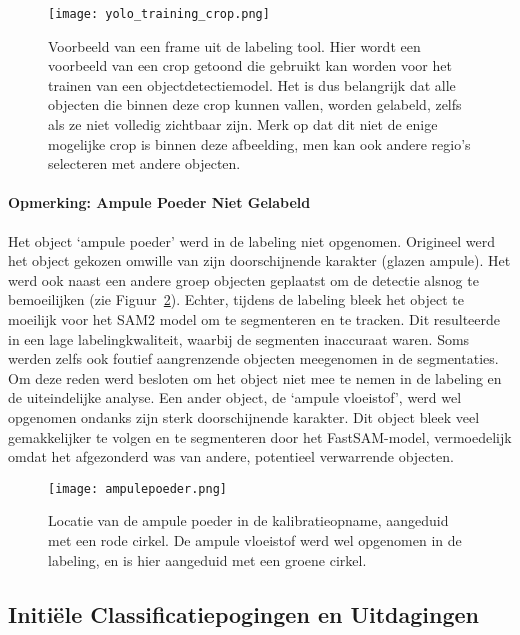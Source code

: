 \begin{figure}[H]
    \centering
    \texttt{[image: yolo\_training\_crop.png]}
    \caption[Voorbeeld van een crop voor objectdetectie]{
        \label{fig:voorbeeld_crop_yolo_training}
        Voorbeeld van een frame uit de labeling tool. 
        Hier wordt een voorbeeld van een crop getoond die gebruikt kan worden voor het trainen van een objectdetectiemodel.
        Het is dus belangrijk dat alle objecten die binnen deze crop kunnen vallen,
        worden gelabeld, zelfs als ze niet volledig zichtbaar zijn.
        Merk op dat dit niet de enige mogelijke crop is binnen deze afbeelding, men kan ook andere regio's selecteren met andere objecten.
    }
\end{figure}

\paragraph{Opmerking: Ampule Poeder Niet Gelabeld}
Het object `ampule poeder' werd in de labeling niet opgenomen. 
Origineel werd het object gekozen omwille van zijn doorschijnende karakter (glazen ampule).
Het werd ook naast een andere groep objecten geplaatst om de detectie alsnog te bemoeilijken (zie Figuur~\ref{fig:ampulepoeder}).
Echter, tijdens de labeling bleek het object te moeilijk voor het SAM2 model om te segmenteren en te tracken.
Dit resulteerde in een lage labelingkwaliteit, waarbij de segmenten inaccuraat waren.
Soms werden zelfs ook foutief aangrenzende objecten meegenomen in de segmentaties.
Om deze reden werd besloten om het object niet mee te nemen in de labeling en de uiteindelijke analyse. 
Een ander object, de `ampule vloeistof', werd wel opgenomen ondanks zijn sterk doorschijnende karakter.
Dit object bleek veel gemakkelijker te volgen en te segmenteren door het FastSAM-model, vermoedelijk omdat het afgezonderd was van andere, 
potentieel verwarrende objecten.

\begin{figure}[H]
    \centering
    \texttt{[image: ampulepoeder.png]}
    \caption[Voorbeeld van de ampule poeder in de kalibratieopname]{
        \label{fig:ampulepoeder}
        Locatie van de ampule poeder in de kalibratieopname, aangeduid met een rode cirkel.
        De ampule vloeistof werd wel opgenomen in de labeling, en is hier aangeduid met een groene cirkel.
    }
\end{figure}



\subsection{Initiële Classificatiepogingen en Uitdagingen}

